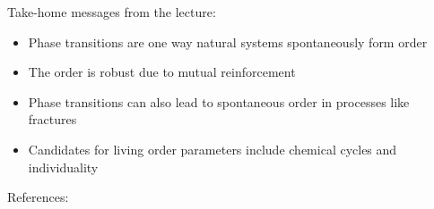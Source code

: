 \documentclass[]{article}
\begin{document}
Take-home messages from the lecture:
\begin{itemize}
	\item Phase transitions are one way natural systems  spontaneously form order
	\item The order is robust due to mutual reinforcement
	\item Phase transitions can also lead to spontaneous order in processes like fractures
	\item Candidates for living order parameters include chemical cycles and individuality
\end{itemize}

References: \cite{smith2011large,goldenfeld2018lectures,smith2015new,smith2016origin}


\printglossaries

 


\end{document}
